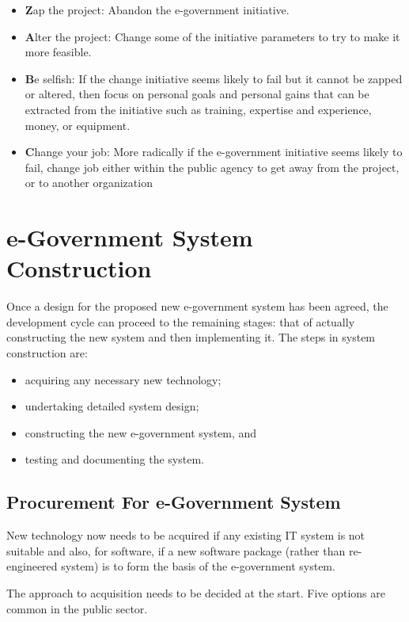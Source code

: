 \begin{itemize}
	\item \textbf{Z}ap the project: Abandon the e-government initiative.
	
	\item \textbf{A}lter the project: Change some of the initiative parameters to try to make it
	more feasible. 
	
	\item \textbf{B}e selfish: If the change initiative seems
	likely to fail but it cannot be zapped or altered, then focus on personal goals and
	personal gains that can be extracted from the initiative such as training, expertise
	and experience, money, or equipment.
	
	\item \textbf{C}hange your job: More radically if the e-government initiative seems likely to
	fail, change job either within the public agency to get away from the project, or
	to another organization
\end{itemize}


\section{e-Government System Construction}
Once a design for the proposed new
e-government system has been agreed, the
development cycle can proceed to the
remaining stages: that of actually constructing the new system and then implementing
it. The steps in system construction are:

\begin{itemize}
	\item acquiring any necessary new technology;
	\item undertaking detailed system design;
	\item constructing the new e-government	system, and
	\item testing and documenting the system.
\end{itemize}

\subsection{Procurement For e-Government System}
New technology now needs to be
acquired if any existing IT system is not suitable and
also, for software, if a new software package
(rather than re-engineered system) is to form
the basis of the e-government system.

The approach to acquisition needs to be
decided at the start. Five options are common in the public sector.

